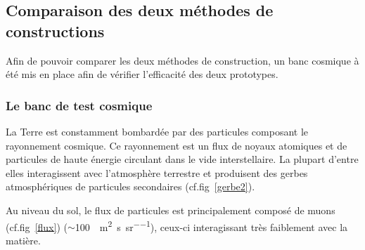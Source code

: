  \subsection{Comparaison des deux méthodes de constructions}
 Afin de pouvoir comparer les deux méthodes de construction, un banc cosmique à été mis en place afin de vérifier l'efficacité des deux prototypes.
 
 \subsubsection{Le banc de test cosmique}
 \label{banc}
 La Terre est constamment bombardée par des particules composant le rayonnement cosmique. Ce rayonnement est un flux de noyaux atomiques et de particules de haute énergie circulant dans le vide interstellaire. La plupart d'entre elles interagissent avec l'atmosphère terrestre et produisent des gerbes atmosphériques de particules secondaires (cf.fig~\ref{gerbe2}).
 
 Au niveau du sol, le flux de particules est principalement composé de muons (cf.fig~\ref{flux}) ($\sim$\SI{100}{\per\square\meter\per\second\per\steradian}), ceux-ci interagissant très faiblement avec la matière.
 
